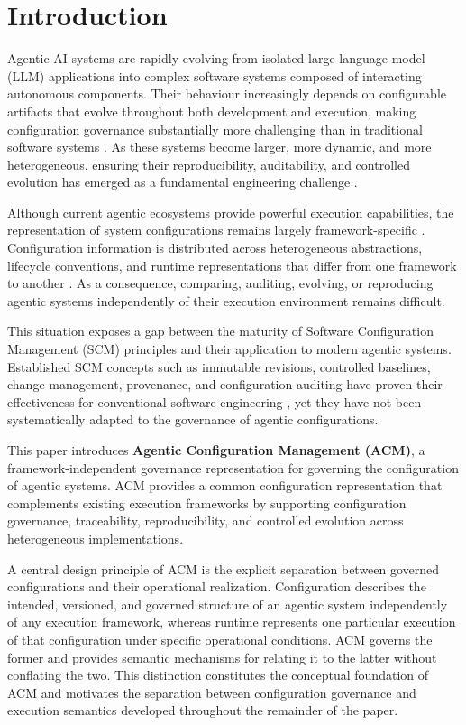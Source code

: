 \documentclass[10pt]{article}
\begin{document}
\section{Introduction}

Agentic AI systems are rapidly evolving from isolated large language model (LLM) applications into complex software systems composed of interacting autonomous components. Their behaviour increasingly depends on configurable artifacts that evolve throughout both development and execution, making configuration governance substantially more challenging than in traditional software systems \cite{bersoff1978software, bersoff1984elements, whitgift1991methods}. As these systems become larger, more dynamic, and more heterogeneous, ensuring their reproducibility, auditability, and controlled evolution has emerged as a fundamental engineering challenge \cite{Hughes03072025, pandey2025agentic}.

Although current agentic ecosystems provide powerful execution capabilities, the representation of system configurations remains largely framework-specific \cite{bandi2025rise}. Configuration information is distributed across heterogeneous abstractions, lifecycle conventions, and runtime representations that differ from one framework to another \cite{acharya2025agentic, Inioluwa2020}. As a consequence, comparing, auditing, evolving, or reproducing agentic systems independently of their execution environment remains difficult.

This situation exposes a gap between the maturity of Software Configuration Management (SCM) principles and their application to modern agentic systems. Established SCM concepts such as immutable revisions, controlled baselines, change management, provenance, and configuration auditing have proven their effectiveness for conventional software engineering \cite{ieee2012ieee, leon2015software, amershi2019}, yet they have not been systematically adapted to the governance of agentic configurations.

This paper introduces \textbf{Agentic Configuration Management (ACM)}, a framework-independent governance representation for governing the configuration of agentic systems. ACM provides a common configuration representation that complements existing execution frameworks by supporting configuration governance, traceability, reproducibility, and controlled evolution across heterogeneous implementations.

A central design principle of ACM is the explicit separation between governed configurations and their operational realization. Configuration describes the intended, versioned, and governed structure of an agentic system independently of any execution framework, whereas runtime represents one particular execution of that configuration under specific operational conditions. ACM governs the former and provides semantic mechanisms for relating it to the latter without conflating the two. This distinction constitutes the conceptual foundation of ACM and motivates the separation between configuration governance and execution semantics developed throughout the remainder of the paper.
\end{document}
